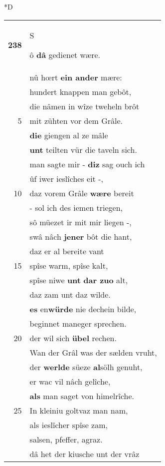 \documentclass[8pt,a4paper,notitlepage]{article}
\begin{document}
\begin{table}[ht]
\begin{minipage}[t]{0.5\linewidth}
\small
\begin{center}*D
\end{center}
\begin{tabular}{rl}
\textbf{238} & \begin{large}S\end{large}ô \textbf{dâ} gedienet wære.\\ 
 & nû hœrt \textbf{ein ander} mære:\\ 
 & hundert knappen man gebôt,\\ 
 & die nâmen in wîze tweheln brôt\\ 
5 & mit zühten vor dem Grâle.\\ 
 & \textbf{die} giengen al ze mâle\\ 
 & \textbf{unt} teilten vür die taveln sich.\\ 
 & man sagte mir - \textbf{diz} sag ouch ich\\ 
 & ûf iwer ieslîches eit -,\\ 
10 & daz vorem Grâle \textbf{wære} bereit\\ 
 & - sol ich des iemen triegen,\\ 
 & sô müezet ir mit mir liegen -,\\ 
 & swâ nâch \textbf{jener} bôt die hant,\\ 
 & daz er al bereite vant\\ 
15 & spîse warm, spîse kalt,\\ 
 & spîse niwe \textbf{unt} \textbf{dar zuo} alt,\\ 
 & daz zam unt daz wilde.\\ 
 & \textbf{es} en\textbf{würde} nie dechein bilde,\\ 
 & beginnet maneger sprechen.\\ 
20 & der wil sich \textbf{übel} rechen.\\ 
 & Wan der Grâl was der sælden vruht,\\ 
 & der \textbf{werlde} süeze \textbf{al}sölh genuht,\\ 
 & er wac vil nâch gelîche,\\ 
 & \textbf{als} man saget von himelrîche.\\ 
25 & In kleiniu goltvaz man nam,\\ 
 & als ieslîcher spîse zam,\\ 
 & salsen, pfeffer, agraz.\\ 
 & dâ het der kiusche unt der vrâz\\ 

\end{tabular}
\end{minipage}
\end{table}
\end{document}
